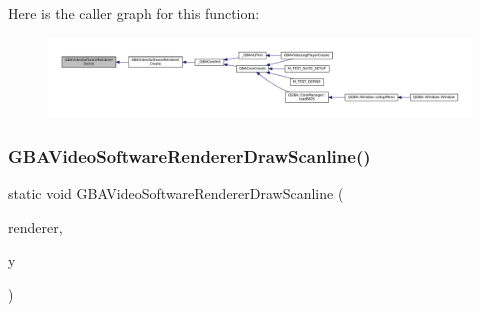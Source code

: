 Here is the caller graph for this function\+:
\nopagebreak
\begin{figure}[H]
\begin{center}
\leavevmode
\includegraphics[width=350pt]{video-software_8c_ac2c59bbe64e1453e725a61a739187a6b_icgraph}
\end{center}
\end{figure}
\mbox{\label{video-software_8c_a114a0223dfad6a2dcb0ad90c763ca781}} 
\subsubsection{\texorpdfstring{G\+B\+A\+Video\+Software\+Renderer\+Draw\+Scanline()}{GBAVideoSoftwareRendererDrawScanline()}}
{\footnotesize\ttfamily static void G\+B\+A\+Video\+Software\+Renderer\+Draw\+Scanline (\begin{DoxyParamCaption}\item[{struct G\+B\+A\+Video\+Renderer $\ast$}]{renderer,  }\item[{\mbox{\hyperlink{ioapi_8h_a787fa3cf048117ba7123753c1e74fcd6}{int}}}]{y }\end{DoxyParamCaption})\hspace{0.3cm}{\ttfamily [static]}}

